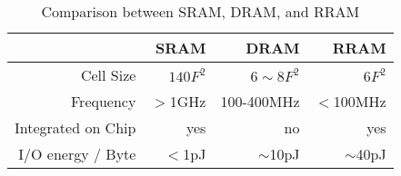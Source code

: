 \begin{table}[htbp]
    \centering
    \caption{Comparison between SRAM, DRAM, and RRAM}
    \vspace{-5pt}
      \begin{tabular}{|r|r|r|r|}
      \hline
            & SRAM  & DRAM  & RRAM \\
      \hline
      Cell Size & $140F^2$ & $6\sim8F^2$ & $6F^2$ \\
      \hline
      Frequency & $>$1GHz & 100-400MHz & $<$100MHz \\
      \hline
      Integrated on Chip & yes   & no    & yes \\
      \hline
      I/O energy / Byte & $<$1pJ   & $\sim$10pJ  & $\sim$40pJ \\
      \hline
      \end{tabular}
    \label{tab:ram}
\end{table}